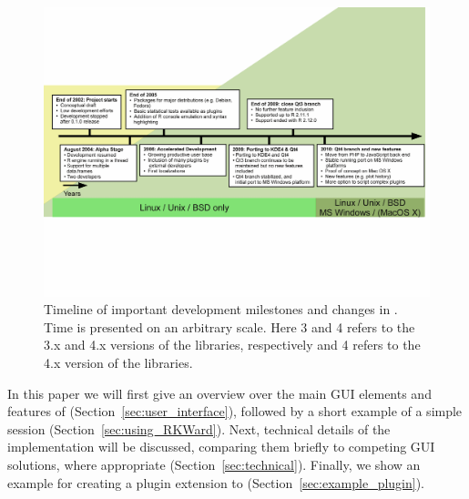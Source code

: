 \begin{figure}[b!]
 \centering
 \includegraphics[clip=true,trim=0cm 5.7cm 0cm 5.7cm,width=16cm]{../figures/timeline.pdf}
 \caption{Timeline of important development milestones and changes in .
          Time is presented on an arbitrary scale. Here 3 and 4 refers to the 3.x and
          4.x versions of the  libraries, respectively and 4 refers to the
          4.x version of the  libraries.}
 \label{fig:timeline}
\end{figure}

In this paper we will first give an overview over the main GUI elements and
features of  (Section~\ref{sec:user_interface}), followed by a short example 
of a simple  session (Section~\ref{sec:using_RKWard}). Next, technical 
details of the implementation will be discussed, comparing them briefly to 
competing GUI solutions, where appropriate (Section~\ref{sec:technical}).
Finally, we show an example for creating a plugin extension to  
(Section~\ref{sec:example_plugin}).
